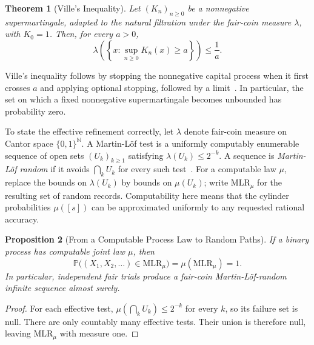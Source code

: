 \documentclass[aps,pra,reprint,superscriptaddress,amsmath,amssymb,floatfix]{revtex4-2}
\theoremstyle{plain}
\newtheorem{theorem}{Theorem}
\newtheorem{proposition}[theorem]{Proposition}
\theoremstyle{definition}
\theoremstyle{remark}
\begin{document}
\begin{theorem}[Ville's Inequality]
  \label{thm:ville}
  Let \((K_n)_{n\geq0}\) be a nonnegative supermartingale, adapted to the
  natural filtration under the fair-coin measure \(\lambda\), with \(K_0=1\).
  Then, for every \(a>0\),
  \begin{equation}
    \lambda\!\left(
      \left\{x:\sup_{n\geq0}K_n(x)\geq a\right\}
    \right)
    \leq\frac1a.
    \label{eq:ville}
  \end{equation}
\end{theorem}

Ville's inequality follows by stopping the nonnegative capital process when it
first crosses \(a\) and applying optional stopping, followed by a
limit~\cite{Ville1939}. In particular, the set on which a fixed nonnegative
supermartingale becomes unbounded has probability zero.

To state the effective refinement correctly, let \(\lambda\) denote fair-coin
measure on Cantor space \(\{0,1\}^{\mathbb N}\). A Martin-L\"of test is a
uniformly computably enumerable sequence of open sets
\((U_k)_{k\geq1}\) satisfying \(\lambda(U_k)\leq2^{-k}\). A sequence is
\emph{Martin-L\"of random} if it avoids \(\bigcap_k U_k\) for every such
test~\cite{MartinLof1966}. For a computable law \(\mu\), replace the bounds
on \(\lambda(U_k)\) by bounds on \(\mu(U_k)\); write
\(\mathrm{MLR}_\mu\) for the resulting set of random records. Computability
here means that the cylinder probabilities \(\mu([s])\) can be approximated
uniformly to any requested rational accuracy.

\begin{proposition}[From a Computable Process Law to Random Paths]
  \label{prop:process-ml}
  If a binary process has computable joint law \(\mu\), then
  \begin{equation}
    \mathbb P\bigl((X_1,X_2,\ldots)\in\mathrm{MLR}_\mu\bigr)
    =\mu(\mathrm{MLR}_\mu)=1.
    \label{eq:process-ml}
  \end{equation}
  In particular, independent fair trials produce a fair-coin Martin-L\"of-random
  infinite sequence almost surely.
\end{proposition}

\begin{proof}
For each effective test, \(\mu(\bigcap_k U_k)\leq2^{-k}\) for every \(k\),
so its failure set is null. There are only countably many effective tests.
Their union is therefore null, leaving \(\mathrm{MLR}_\mu\) with measure one.
\end{proof}
\end{document}
